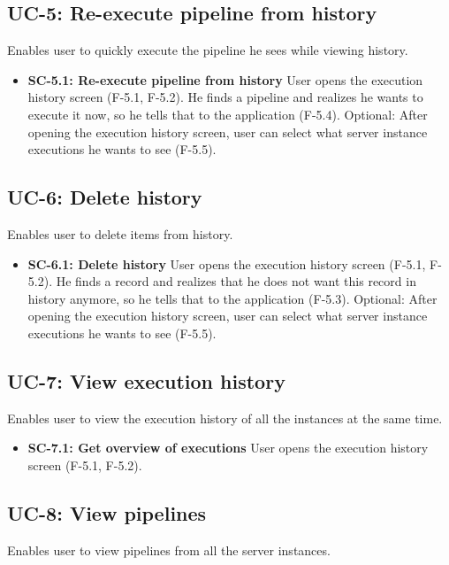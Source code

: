 \subsection*{UC-5: Re-execute pipeline from history}
Enables user to quickly execute the pipeline he sees while viewing history.

\begin{itemize}
\item \textbf{SC-5.1: Re-execute pipeline from history}
User opens the execution history screen (F-5.1, F-5.2). He finds a pipeline and realizes he wants to execute it now, so he tells that to the application (F-5.4). Optional: After opening the execution history screen, user can select what server instance executions he wants to see (F-5.5).

\end{itemize}

\subsection*{UC-6: Delete history}
Enables user to delete items from history.

\begin{itemize}
\item \textbf{SC-6.1: Delete history}
User opens the execution history screen (F-5.1, F-5.2). He finds a record and realizes that he does not want this record in history anymore, so he tells that to the application (F-5.3). Optional: After opening the execution history screen, user can select what server instance executions he wants to see (F-5.5).

\end{itemize}

\subsection*{UC-7: View execution history}
Enables user to view the execution history of all the instances at the same time.

\begin{itemize}
\item \textbf{SC-7.1: Get overview of executions}
User opens the execution history screen (F-5.1, F-5.2).

\end{itemize}

\subsection*{UC-8: View pipelines}
Enables user to view pipelines from all the server instances.

